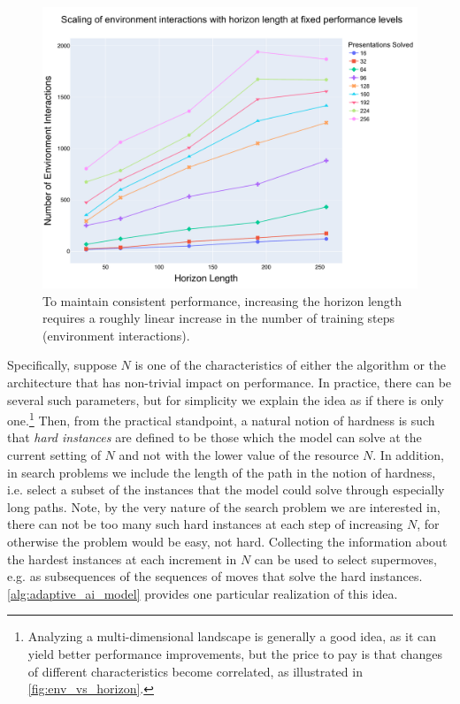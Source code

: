 \begin{figure}
	\centering
	\includegraphics[scale=0.35]{fig/env_vs_horizon.pdf}
	\caption{To maintain consistent performance, increasing the horizon length requires a roughly linear increase in the number of training steps (environment interactions).}
	\label{fig:env_vs_horizon}
\end{figure}

Specifically, suppose $N$ is one of the characteristics of either the algorithm or the architecture that has non-trivial impact on performance. In practice, there can be several such parameters, but for simplicity we explain the idea as if there is only one.\footnote{Analyzing a multi-dimensional landscape is generally a good idea, as it can yield better performance improvements, but the price to pay is that changes of different characteristics become correlated, as illustrated in \autoref{fig:env_vs_horizon}.} Then, from the practical standpoint, a natural notion of hardness is such that \textit{hard instances} are defined to be those which the model can solve at the current setting of $N$ and not with the lower value of the resource $N$. In addition, in search problems we include the length of the path in the notion of hardness, i.e. select a subset of the instances that the model could solve through especially long paths. Note, by the very nature of the search problem we are interested in, there can not be too many such hard instances at each step of increasing $N$, for otherwise the problem would be easy, not hard. Collecting the information about the hardest instances at each increment in $N$ can be used to select supermoves, e.g. as subsequences of the sequences of moves that solve the hard instances. \autoref{alg:adaptive_ai_model} provides one particular realization of this idea.

